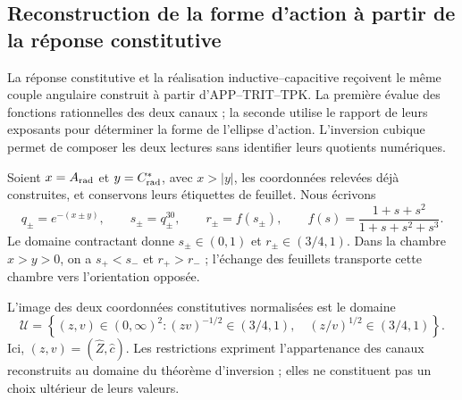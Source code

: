\subsection{Reconstruction de la forme d’action à partir de la réponse constitutive}
\label{iii:subsec:puente-forma-LC}

La réponse constitutive et la réalisation inductive--capacitive reçoivent
le même couple angulaire construit à partir d’APP--TRIT--TPK. La première évalue
des fonctions rationnelles des deux canaux ; la seconde utilise le rapport de
leurs exposants pour déterminer la forme de l’ellipse d’action.
L’inversion cubique permet de composer les deux lectures sans identifier leurs
quotients numériques.

Soient $x=A_{\rm rad}$ et $y=C^*_{\rm rad}$, avec $x>|y|$, les coordonnées
relevées déjà construites, et conservons leurs étiquettes de feuillet. Nous écrivons
\begin{equation}
 q_\pm=e^{-(x\pm y)},\qquad s_\pm=q_\pm^{30},\qquad
 r_\pm=f(s_\pm),\qquad
 f(s)=\frac{1+s+s^2}{1+s+s^2+s^3}.
 \label{iii:eq:forma-canales}
\end{equation}
Le domaine contractant donne $s_\pm\in(0,1)$ et $r_\pm\in(3/4,1)$. Dans la chambre $x>y>0$, on a $s_+<s_-$ et $r_+>r_-$ ; l'échange des feuillets transporte cette chambre vers l'orientation opposée.

L’image des deux coordonnées constitutives normalisées est le domaine
\begin{equation}
 \mathcal U=\left\{(z,v)\in(0,\infty)^2:
   (zv)^{-1/2}\in(3/4,1),\quad
   (z/v)^{1/2}\in(3/4,1)\right\}.
 \label{iii:eq:forma-dominio}
\end{equation}
Ici, $(z,v)=(\widehat Z,\widehat c)$. Les restrictions expriment l'appartenance des canaux reconstruits au domaine du théorème d'inversion ; elles ne constituent pas un choix ultérieur de leurs valeurs.

